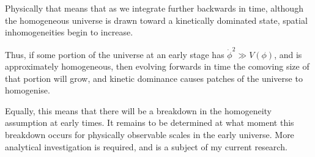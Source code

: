 Physically that means that as we integrate further backwards in time, although the homogeneous universe is drawn toward a kinetically dominated state, spatial inhomogeneities begin to increase.

Thus, if some portion of the universe at an early stage has $\dot{\phi}^2 \gg V(\phi)$, and is approximately homogeneous, then evolving forwards in time the comoving size of that portion will grow, and kinetic dominance causes patches of the universe to homogenise.

Equally, this means that there will be a breakdown in the homogeneity assumption at early times. It remains to be determined at what moment this breakdown occurs for physically observable scales in the early universe. More analytical investigation is required, and is a subject of my current research.

\cleardoublepage{}
